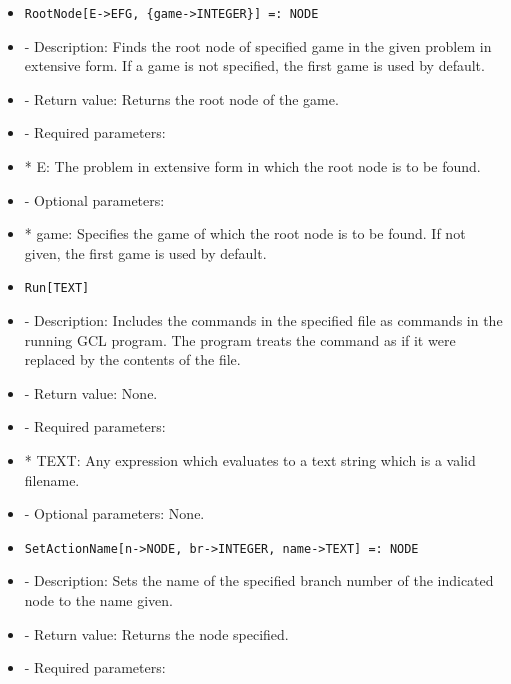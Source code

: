 \begin{itemize}
\item
\begin{verbatim}
RootNode[E->EFG, {game->INTEGER}] =: NODE
\end{verbatim}

\bd
\item
- Description:  Finds the root node of specified game in the given 
problem in extensive form.  If a game is not specified, the first game 
is used by default.
\item
- Return value:  Returns the root node of the game.
\item
- Required parameters:
	
\bd
\item
*  E:  The problem in extensive form in which the root node is to be
found.
\ed

\item
- Optional parameters:

\bd
\item
*  game:  Specifies the game of which the root node is to be found.
If not given, the first game is used by default.
\ed
\ed

\item

\begin{verbatim}
Run[TEXT]
\end{verbatim}

\bd
\item
- Description:  Includes the commands in the specified file as commands 
in the running GCL program.  The program treats the command as if it 
were replaced by the contents of the file.
\item
- Return value:  None.
\item
- Required parameters:
	
\bd
\item
*  TEXT:  Any expression which evaluates to a text string which is a
valid filename.
\ed

\item
- Optional parameters:  None.
\ed

\item

\begin{verbatim}
SetActionName[n->NODE, br->INTEGER, name->TEXT] =: NODE
\end{verbatim}

\bd
\item
- Description:  Sets the name of the specified branch number of the 
indicated node to the name given.
\item
- Return value:  Returns the node specified.
\item
- Required parameters:
	

\end{itemize}
